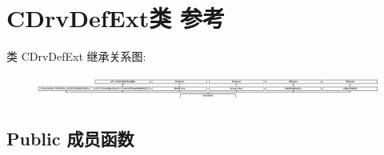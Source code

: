 \hypertarget{class_c_drv_def_ext}{}\section{C\+Drv\+Def\+Ext类 参考}
\label{class_c_drv_def_ext}
类 C\+Drv\+Def\+Ext 继承关系图\+:\begin{figure}[H]
\begin{center}
\leavevmode
\includegraphics[height=0.795455cm]{class_c_drv_def_ext}
\end{center}
\end{figure}
\subsection*{Public 成员函数}

